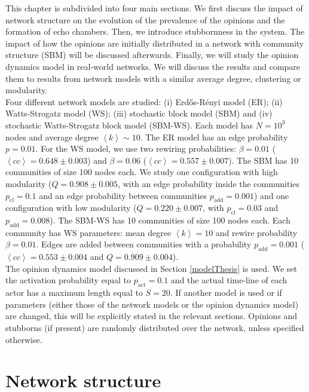 \documentclass[11 pt , letterpaper , twoside , openright]{book}
\begin{document}
This chapter is subdivided into four main sections. We first discuss the impact of network structure on the evolution of the prevalence of the opinions and the formation of echo chambers. Then, we introduce stubbornness in the system. The impact of how the opinions are initially distributed in a network with community structure (SBM) will be discussed afterwards. Finally, we will study the opinion dynamics model in real-world networks. We will discuss the results and compare them to results from network models with a similar average degree, clustering or modularity.\\
\newline
Four different network models are studied: (i) Erd\H{o}s-R\'{e}nyi model (ER); (ii) Watts-Strogatz model (WS); (iii) stochastic block model (SBM) and (iv) stochastic Watts-Strogatz block model (SBM-WS). Each model has $N = 10^3$ nodes and average degree $\left<k\right> \sim 10$. The ER model has an edge probability $p = 0.01$. For the WS model, we use two rewiring probabilities: $\beta = 0.01$ ($\left<cc\right> = 0.648 \pm 0.003$) and $\beta = 0.06$ ($\left<cc\right> = 0.557 \pm 0.007$). The SBM has 10 communities of size 100 nodes each. We study one configuration with high modularity ($Q = 0.908 \pm 0.005$, with an edge probability inside the communities $p_{\text{cl}} = 0.1$ and an edge probability between communities $p_{\text{add}} = 0.001$) and one configuration with low modularity ($Q = 0.220 \pm 0.007$, with $p_{\text{cl}} = 0.03$ and $p_{\text{add}} = 0.008$). The SBM-WS has 10 communities of size 100 nodes each. Each community has WS parameters: mean degree $\left<k\right> =10$ and rewire probability $\beta = 0.01$. Edges are added between communities with a probability $p_{\text{add}} = 0.001$ ($\left<cc\right> = 0.553 \pm 0.004$ and $Q = 0.909 \pm 0.004$).\\
\newline
The opinion dynamics model discussed in Section \ref{modelThesis} is used. We set the activation probability equal to $p_{\text{act}} = 0.1$ and the actual time-line of each actor has a maximum length equal to $S=20$. If another model is used or if parameters (either those of the network models or the opinion dynamics model) are changed, this will be explicitly stated in the relevant sections. Opinions and stubborns (if present) are randomly distributed over the network, unless specified otherwise.

\section{Network structure}\label{netw_struc}
\end{document}

